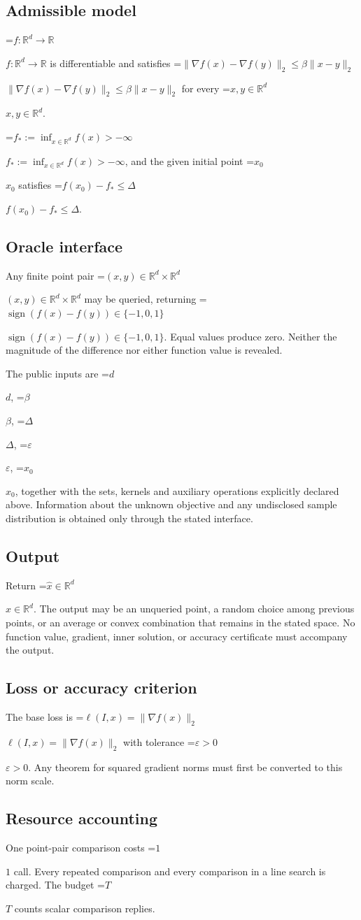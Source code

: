 \documentclass[10pt,a4paper]{article}
\newcommand{\AtlasMath}[1]{\par\begingroup\centering\setbox0=\hbox{$\displaystyle #1$}\ifdim\wd0>1.4\linewidth\typeout{ATLAS WIDE FORMULA: \the\wd0}\fi\ifdim\wd0>\linewidth\resizebox{\linewidth}{!}{\box0}\else\box0\fi\par\endgroup}
\newcommand{\AtlasInlineMath}[1]{\begingroup\setbox0=\hbox{$#1$}\ifdim\wd0>.4\linewidth\endgroup\AtlasMath{#1}\else\endgroup$#1$\fi}
\begin{document}
\subsection{Admissible model}
\AtlasInlineMath{f:\mathbb{R}^d\to\mathbb{R}} is differentiable and satisfies \AtlasInlineMath{\|\nabla f(x)-\nabla f(y)\|_2\le\beta\|x-y\|_2} for every \AtlasInlineMath{x,y\in\mathbb{R}^d}.

\AtlasInlineMath{f_*:=\inf_{x\in\mathbb{R}^d}f(x)>-\infty}, and the given initial point \AtlasInlineMath{x_0} satisfies \AtlasInlineMath{f(x_0)-f_*\le\Delta}.

\subsection{Oracle interface}
Any finite point pair \AtlasInlineMath{(x,y)\in\mathbb{R}^d\times\mathbb{R}^d} may be queried, returning \AtlasInlineMath{\operatorname{sign}(f(x)-f(y))\in\{-1,0,1\}}. Equal values produce zero. Neither the magnitude of the difference nor either function value is revealed.

The public inputs are \AtlasInlineMath{d}, \AtlasInlineMath{\beta}, \AtlasInlineMath{\Delta}, \AtlasInlineMath{\varepsilon}, \AtlasInlineMath{x_0}, together with the sets, kernels and auxiliary operations explicitly declared above. Information about the unknown objective and any undisclosed sample distribution is obtained only through the stated interface.

\subsection{Output}
Return \AtlasInlineMath{\widehat{x}\in \mathbb{R}^d}. The output may be an unqueried point, a random choice among previous points, or an average or convex combination that remains in the stated space. No function value, gradient, inner solution, or accuracy certificate must accompany the output.

\subsection{Loss or accuracy criterion}
The base loss is \AtlasInlineMath{\ell(I,x)=\|\nabla f(x)\|_2} with tolerance \AtlasInlineMath{\varepsilon>0}. Any theorem for squared gradient norms must first be converted to this norm scale.

\subsection{Resource accounting}
One point-pair comparison costs \AtlasInlineMath{1} call. Every repeated comparison and every comparison in a line search is charged. The budget \AtlasInlineMath{T} counts scalar comparison replies.
\end{document}
